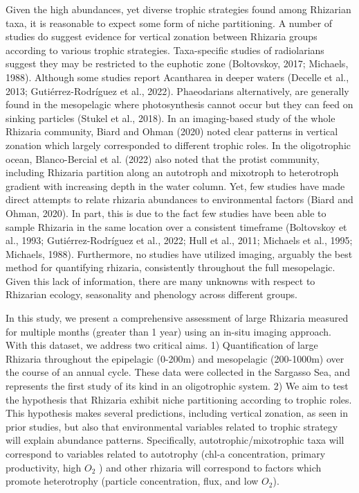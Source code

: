 \documentclass[
]{article}
\begin{document}
Given the high abundances, yet diverse trophic strategies found among
Rhizarian taxa, it is reasonable to expect some form of niche
partitioning. A number of studies do suggest evidence for vertical
zonation between Rhizaria groups according to various trophic
strategies. Taxa-specific studies of radiolarians suggest they may be
restricted to the euphotic zone (Boltovskoy, 2017; Michaels, 1988).
Although some studies report Acantharea in deeper waters (Decelle et
al., 2013; Gutiérrez-Rodríguez et al., 2022). Phaeodarians
alternatively, are generally found in the mesopelagic where
photosynthesis cannot occur but they can feed on sinking particles
(Stukel et al., 2018). In an imaging-based study of the whole Rhizaria
community, Biard and Ohman (2020) noted clear patterns in vertical
zonation which largely corresponded to different trophic roles. In the
oligotrophic ocean, Blanco-Bercial et al. (2022) also noted that the
protist community, including Rhizaria partition along an autotroph and
mixotroph to heterotroph gradient with increasing depth in the water
column. Yet, few studies have made direct attempts to relate rhizaria
abundances to environmental factors (Biard and Ohman, 2020). In part,
this is due to the fact few studies have been able to sample Rhizaria in
the same location over a consistent timeframe (Boltovskoy et al., 1993;
Gutiérrez-Rodríguez et al., 2022; Hull et al., 2011; Michaels et al.,
1995; Michaels, 1988). Furthermore, no studies have utilized imaging,
arguably the best method for quantifying rhizaria, consistently
throughout the full mesopelagic. Given this lack of information, there
are many unknowns with respect to Rhizarian ecology, seasonality and
phenology across different groups.

In this study, we present a comprehensive assessment of large Rhizaria
measured for multiple months (greater than 1 year) using an in-situ
imaging approach. With this dataset, we address two critical aims. 1)
Quantification of large Rhizaria throughout the epipelagic (0-200m) and
mesopelagic (200-1000m) over the course of an annual cycle. These data
were collected in the Sargasso Sea, and represents the first study of
its kind in an oligotrophic system. 2) We aim to test the hypothesis
that Rhizaria exhibit niche partitioning according to trophic roles.
This hypothesis makes several predictions, including vertical zonation,
as seen in prior studies, but also that environmental variables related
to trophic strategy will explain abundance patterns. Specifically,
autotrophic/mixotrophic taxa will correspond to variables related to
autotrophy (chl-a concentration, primary productivity, high \(O_2\) )
and other rhizaria will correspond to factors which promote heterotrophy
(particle concentration, flux, and low \(O_2\)).
\end{document}
